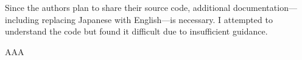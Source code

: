 \begin{point}
	Since the authors plan to share their source code, additional documentation—including replacing Japanese with English—is necessary. I attempted to understand the code but found it difficult due to insufficient guidance.
\end{point}

\begin{reply}
	AAA
\end{reply}

